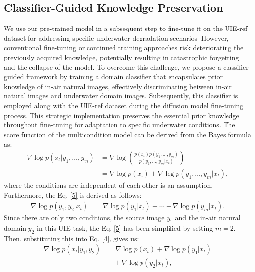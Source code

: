 \documentclass[3p,12pt,authoryear]{elsarticle}
\begin{document}
\subsection{Classifier-Guided Knowledge Preservation}
We use our pre-trained model in a subsequent step to fine-tune it on the UIE-ref dataset for addressing specific underwater degradation scenarios. However, conventional fine-tuning or continued training approaches risk deteriorating the previously acquired knowledge, potentially resulting in catastrophic forgetting and the collapse of the model. To overcome this challenge, we propose a classifier-guided framework by training a domain classifier that encapsulates prior knowledge of in-air natural images, effectively discriminating between in-air natural images and underwater domain images. Subsequently, this classifier is employed along with the UIE-ref dataset during the diffusion model fine-tuning process. This strategic implementation preserves the essential prior knowledge throughout fine-tuning for adaptation to specific underwater conditions.
The score function of the multicondition
model can be derived from the Bayes formula as:
\begin{equation}
\label{4}
\begin{split}
\nabla \log p(x_t|y_1, \ldots, y_m) &= \nabla \log \left( \frac{p(x_t)p(y_1, \ldots, y_m)}{p(y_1, \ldots, y_m|x_t)} \right) \\
&= \nabla \log p(x_t) + \nabla \log p(y_1, \ldots, y_m|x_t),
\end{split}
\end{equation}
where the conditions are independent of each other is an assumption. Furthermore, the Eq. \ref{5} is derived as follows:
\begin{equation}
\label{5}
\begin{split}
\nabla \log p(y_1, y_2 | x_t) 
&= \nabla \log p(y_1|x_t) + \cdots + \nabla \log p(y_m|x_t).
\end{split}
\end{equation}
Since there are only two conditions, the source image $y_1$ and the in-air natural domain $y_2$ in this UIE task, the Eq. \ref{5} has been simplified by setting $m=2$. Then, substituting this into Eq. \ref{4}, gives us:
\begin{equation}
\label{6}
\begin{split}
\nabla \log p(x_t|y_1, y_2) 
&= \nabla \log p(x_t) + \nabla \log p(y_1|x_t) \\
&\quad + \nabla \log p(y_2|x_t),
\end{split}
\end{equation}
\end{document}
